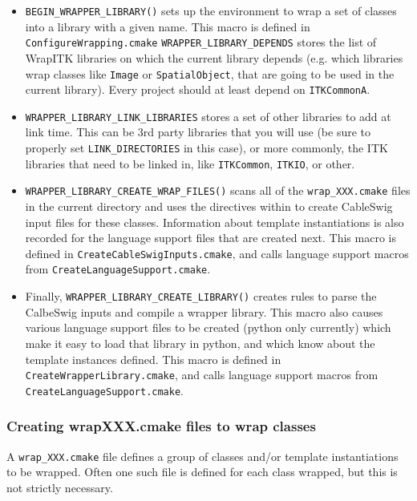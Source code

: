 \documentclass{InsightArticle}
\begin{document}
\begin{itemize}
  \item \verb$BEGIN_WRAPPER_LIBRARY()$ sets up the environment to wrap a set of classes into a
library with a given name. This macro is defined in \verb$ConfigureWrapping.cmake$
\verb$WRAPPER_LIBRARY_DEPENDS$ stores the list of WrapITK libraries on which the
current library depends (e.g. which libraries wrap classes like \verb$Image$ or
\verb$SpatialObject$, that are going to be used in the current library). Every project
should at least depend on \verb$ITKCommonA$.

  \item \verb$WRAPPER_LIBRARY_LINK_LIBRARIES$ stores a set of other libraries to add at link
time. This can be 3rd party libraries that you will use (be sure to properly set
\verb$LINK_DIRECTORIES$ in this case), or more commonly, the ITK libraries that need to
be linked in, like \verb$ITKCommon$, \verb$ITKIO$, or other. 

  \item \verb$WRAPPER_LIBRARY_CREATE_WRAP_FILES()$ scans all of the \verb$wrap_XXX.cmake$ files in the
current directory and uses the directives within to create CableSwig input files
for these classes. Information about template instantiations is also recorded
for the language support files that are created next. This macro is defined in
\verb$CreateCableSwigInputs.cmake$, and calls language support macros from
\verb$CreateLanguageSupport.cmake$.

  \item Finally, \verb$WRAPPER_LIBRARY_CREATE_LIBRARY()$ creates rules to parse the CalbeSwig
inputs and compile a wrapper library. This macro also causes various language
support files to be created (python only currently) which make it easy to load
that library in python, and which know about the template instances defined.
This macro is defined in \verb$CreateWrapperLibrary.cmake$, and calls language support
macros from \verb$CreateLanguageSupport.cmake$.
\end{itemize}


     \subsubsection{Creating wrapXXX.cmake files to wrap classes}

A \verb$wrap_XXX.cmake$ file defines a group of classes and/or template instantiations
to be wrapped. Often one such file is defined for each class wrapped, but this
is not strictly necessary.
\end{document}
